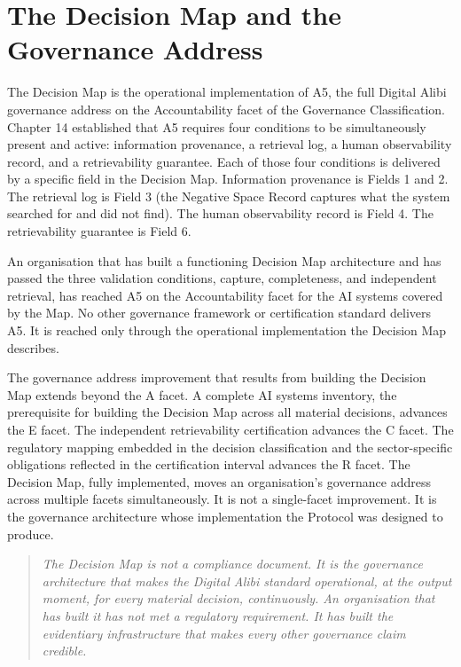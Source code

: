 \scenebreak

\section{The Decision Map and the Governance Address}

The Decision Map is the operational implementation of A5, the full Digital Alibi governance address on the Accountability facet of the Governance Classification. Chapter 14 established that A5 requires four conditions to be simultaneously present and active: information provenance, a retrieval log, a human observability record, and a retrievability guarantee. Each of those four conditions is delivered by a specific field in the Decision Map. Information provenance is Fields 1 and 2. The retrieval log is Field 3 (the Negative Space Record captures what the system searched for and did not find). The human observability record is Field 4. The retrievability guarantee is Field 6.

An organisation that has built a functioning Decision Map architecture and has passed the three validation conditions, capture, completeness, and independent retrieval, has reached A5 on the Accountability facet for the AI systems covered by the Map. No other governance framework or certification standard delivers A5. It is reached only through the operational implementation the Decision Map describes.

The governance address improvement that results from building the Decision Map extends beyond the A facet. A complete AI systems inventory, the prerequisite for building the Decision Map across all material decisions, advances the E facet. The independent retrievability certification advances the C facet. The regulatory mapping embedded in the decision classification and the sector-specific obligations reflected in the certification interval advances the R facet. The Decision Map, fully implemented, moves an organisation's governance address across multiple facets simultaneously. It is not a single-facet improvement. It is the governance architecture whose implementation the Protocol was designed to produce.

\begin{quote}
\emph{The Decision Map is not a compliance document. It is the governance architecture that makes the Digital Alibi standard operational, at the output moment, for every material decision, continuously. An organisation that has built it has not met a regulatory requirement. It has built the evidentiary infrastructure that makes every other governance claim credible.}
\end{quote}


